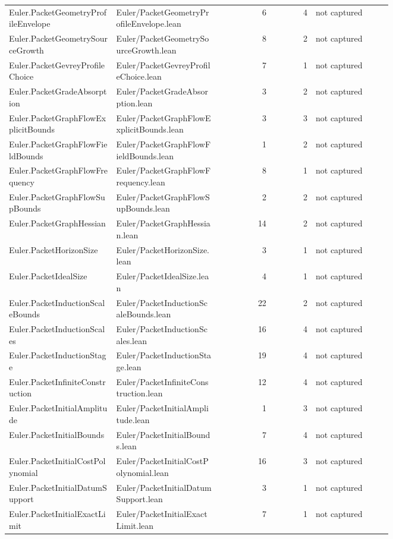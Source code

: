 \documentclass[10pt]{article}
\begin{document}
\begin{longtable}{p{0.28\linewidth}p{0.27\linewidth}r r p{0.20\linewidth}}
Euler.PacketGeometryProfileEnvelope & Euler/PacketGeometryProfileEnvelope.lean & 6 & 4 & not captured\\
Euler.PacketGeometrySourceGrowth & Euler/PacketGeometrySourceGrowth.lean & 8 & 2 & not captured\\
Euler.PacketGevreyProfileChoice & Euler/PacketGevreyProfileChoice.lean & 7 & 1 & not captured\\
Euler.PacketGradeAbsorption & Euler/PacketGradeAbsorption.lean & 3 & 2 & not captured\\
Euler.PacketGraphFlowExplicitBounds & Euler/PacketGraphFlowExplicitBounds.lean & 3 & 3 & not captured\\
Euler.PacketGraphFlowFieldBounds & Euler/PacketGraphFlowFieldBounds.lean & 1 & 2 & not captured\\
Euler.PacketGraphFlowFrequency & Euler/PacketGraphFlowFrequency.lean & 8 & 1 & not captured\\
Euler.PacketGraphFlowSupBounds & Euler/PacketGraphFlowSupBounds.lean & 2 & 2 & not captured\\
Euler.PacketGraphHessian & Euler/PacketGraphHessian.lean & 14 & 2 & not captured\\
Euler.PacketHorizonSize & Euler/PacketHorizonSize.lean & 3 & 1 & not captured\\
Euler.PacketIdealSize & Euler/PacketIdealSize.lean & 4 & 1 & not captured\\
Euler.PacketInductionScaleBounds & Euler/PacketInductionScaleBounds.lean & 22 & 2 & not captured\\
Euler.PacketInductionScales & Euler/PacketInductionScales.lean & 16 & 4 & not captured\\
Euler.PacketInductionStage & Euler/PacketInductionStage.lean & 19 & 4 & not captured\\
Euler.PacketInfiniteConstruction & Euler/PacketInfiniteConstruction.lean & 12 & 4 & not captured\\
Euler.PacketInitialAmplitude & Euler/PacketInitialAmplitude.lean & 1 & 3 & not captured\\
Euler.PacketInitialBounds & Euler/PacketInitialBounds.lean & 7 & 4 & not captured\\
Euler.PacketInitialCostPolynomial & Euler/PacketInitialCostPolynomial.lean & 16 & 3 & not captured\\
Euler.PacketInitialDatumSupport & Euler/PacketInitialDatumSupport.lean & 3 & 1 & not captured\\
Euler.PacketInitialExactLimit & Euler/PacketInitialExactLimit.lean & 7 & 1 & not captured\\

\end{longtable}
\end{document}
